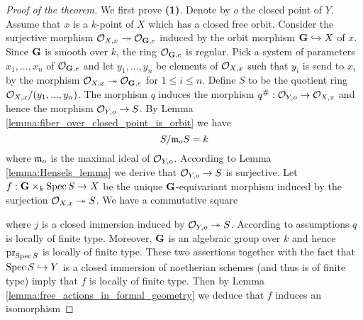 \begin{proof}[Proof of the theorem]
We first prove \textbf{(1)}. Denote by $o$ the closed point of $Y$. Assume that $x$ is a $k$-point of $X$ which has a closed free orbit. Consider the surjective morphism ${\mathcal O}_{X,x}\twoheadrightarrow {\mathcal O}_{\mathbf{G},e}$ induced by the orbit morphism $\mathbf{G}\hookrightarrow X$ of $x$. Since $\mathbf{G}$ is smooth over $k$, the ring ${\mathcal O}_{\mathbf{G},e}$ is regular. Pick a system of parameters $x_1,...,x_n$ of ${\mathcal O}_{\mathbf{G},e}$ and let $y_1,...,y_n$ be elements of ${\mathcal O}_{X,x}$ such that $y_i$ is send to $x_i$ by the morphism ${\mathcal O}_{X,x}\twoheadrightarrow {\mathcal O}_{\mathbf{G},e}$ for $1\leq i\leq n$. Define $S$ to be the quotient ring ${\mathcal O}_{X,x}/(y_1,...,y_n)$. The morphism $q$ induces the morphism $q^{\#}:{\mathcal O}_{Y,o} \rightarrow {\mathcal O}_{X,x}$ and hence the morphism ${\mathcal O}_{Y,o}\rightarrow S$. By Lemma \ref{lemma:fiber_over_closed_point_is_orbit} we have
$$S/\mathfrak{m}_oS = k$$
where $\mathfrak{m}_o$ is the maximal ideal of ${\mathcal O}_{Y,o}$. According to Lemma \ref{lemma:Hensels_lemma} we derive that ${\mathcal O}_{Y,o}\rightarrow S$ is surjective. Let $f:\mathbf{G}\times_k\mathrm{Spec}\, S\rightarrow X$ be the unique $\mathbf{G}$-equivariant morphism induced by the surjection ${\mathcal O}_{X,x}\twoheadrightarrow S$. We have a commutative square
\begin{center}
\end{center}
where $j$ is a closed immersion induced by ${\mathcal O}_{Y,o}\twoheadrightarrow S$. According to assumptions $q$ is locally of finite type. Moreover, $\mathbf{G}$ is an algebraic group over $k$ and hence $\mathrm{pr}_{\mathrm{Spec}\, S}$ is locally of finite type. These two assertions together with the fact that $\mathrm{Spec}\, S\hookrightarrow Y$ is a closed immersion of noetherian schemes (and thus is of finite type) imply that $f$ is locally of finite type. Then by Lemma \ref{lemma:free_actions_in_formal_geometry} we deduce that $f$ induces an isomorphism 

\end{proof}
